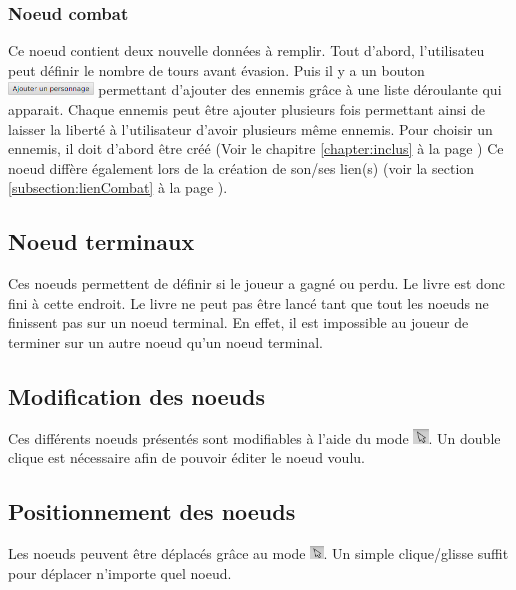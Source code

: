 \begin{description}
			\subsubsection{Noeud combat}\label{subsubsec:combat}
				Ce noeud contient deux nouvelle données à remplir. Tout d'abord, l'utilisateu peut définir le nombre de tours avant évasion. Puis il y a un bouton \includegraphics[height=10pt]{img/noeudAddPersonnage} permettant d'ajouter des ennemis grâce à une liste déroulante qui apparait. Chaque ennemis peut être ajouter plusieurs fois permettant ainsi de laisser la liberté à l'utilisateur d'avoir plusieurs même ennemis. Pour choisir un ennemis, il doit d'abord être créé (Voir le chapitre \ref{chapter:inclus} à la page \pageref{chapter:inclus})
				Ce noeud diffère également lors de la création de son/ses lien(s) (voir la section \ref{subsection:lienCombat} à la page \pageref{subsection:lienCombat}).

		\subsection{Noeud terminaux}
			Ces noeuds permettent de définir si le joueur a gagné ou perdu. Le livre est donc fini à cette endroit. Le livre ne peut pas être lancé tant que tout les noeuds ne finissent pas sur un noeud terminal. En effet, il est impossible au joueur de terminer sur un autre noeud qu'un noeud terminal.

		\subsection{Modification des noeuds}
			Ces différents noeuds présentés sont modifiables à l'aide du mode \includegraphics[height=0.4cm]{img/modeSelected.png}. Un double clique est nécessaire afin de pouvoir éditer le noeud voulu.

		\subsection{Positionnement des noeuds}
			Les noeuds peuvent être déplacés grâce au mode \includegraphics[height=10pt]{img/modeSelected.png}. Un simple clique/glisse suffit pour déplacer n'importe quel noeud.


\end{description}
